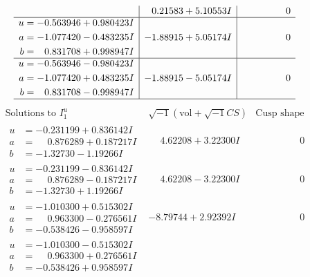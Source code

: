 \documentclass[1p]{elsarticle_modified}
\theoremstyle{definition}
\newcommand{\I}{\sqrt{-1}}
\begin{document}
$$\begin{array}{c|c|c}
 & \phantom{-}0.21583 + 5.10553 I & \phantom{-0.000000 } 0 \\ \hline\begin{aligned}
u &= -0.563946 + 0.980423 I \\
a &= -1.077420 - 0.483235 I \\
b &= \phantom{-}0.831708 + 0.998947 I\end{aligned}
 & -1.88915 + 5.05174 I & \phantom{-0.000000 } 0 \\ \hline\begin{aligned}
u &= -0.563946 - 0.980423 I \\
a &= -1.077420 + 0.483235 I \\
b &= \phantom{-}0.831708 - 0.998947 I\end{aligned}
 & -1.88915 - 5.05174 I & \phantom{-0.000000 } 0\\
 \hline 
 \end{array}$$\newpage$$\begin{array}{c|c|c}  
\text{Solutions to }I^u_{1}& \I (\text{vol} + \sqrt{-1}CS) & \text{Cusp shape}\\
 \hline 
\begin{aligned}
u &= -0.231199 + 0.836142 I \\
a &= \phantom{-}0.876289 + 0.187217 I \\
b &= -1.32730 - 1.19266 I\end{aligned}
 & \phantom{-}4.62208 + 3.22300 I & \phantom{-0.000000 } 0 \\ \hline\begin{aligned}
u &= -0.231199 - 0.836142 I \\
a &= \phantom{-}0.876289 - 0.187217 I \\
b &= -1.32730 + 1.19266 I\end{aligned}
 & \phantom{-}4.62208 - 3.22300 I & \phantom{-0.000000 } 0 \\ \hline\begin{aligned}
u &= -1.010300 + 0.515302 I \\
a &= \phantom{-}0.963300 - 0.276561 I \\
b &= -0.538426 - 0.958597 I\end{aligned}
 & -8.79744 + 2.92392 I & \phantom{-0.000000 } 0 \\ \hline\begin{aligned}
u &= -1.010300 - 0.515302 I \\
a &= \phantom{-}0.963300 + 0.276561 I \\
b &= -0.538426 + 0.958597 I\end{aligned}

\end{array}$$
\end{document}
